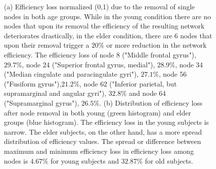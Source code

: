 \documentclass[12pt,a4paper]{article}
\begin{document}
\begin{figure}[!ht]
    \hfill
    \caption{\small (a) Efficiency loss normalized (0,1) due to the removal of single nodes in both age groups. While in the young condition there are no nodes that upon its removal the efficiency of the resulting network deteriorates drastically, in the elder condition, there are 6 nodes that upon their removal trigger a $20\%$ or more reduction in the network efficiency. The efficiency loss of node 8 ("Middle frontal gyrus"), $29.7\%$, node 24 ("Superior frontal gyrus, medial"), $28.9\%$, node 34 ("Median cingulate and paracingulate gyri"), $27.1\%$, node 56 ("Fusiform gyrus"),$21.2\%$, node 62 ("Inferior parietal, but supramarginal and angular gyri"), $32.8\%$ and node 64 ("Supramarginal gyrus"), $26.5\%$.   
  \small (b) Distribution of efficiency loss after node removal in both young (green histogram) and elder groups (blue histogram). The efficiency loss in the young subjects is narrow. The elder subjects, on the other hand, has a more spread distribution of efficiency values. 
The spread or difference between maximum and minimum efficiency loss in efficiency loss among nodes is $4.67\%$ for young subjects and $32.87\%$ for old subjects.}
    \label{fig:gauss}
  \end{figure} 
\end{document}
